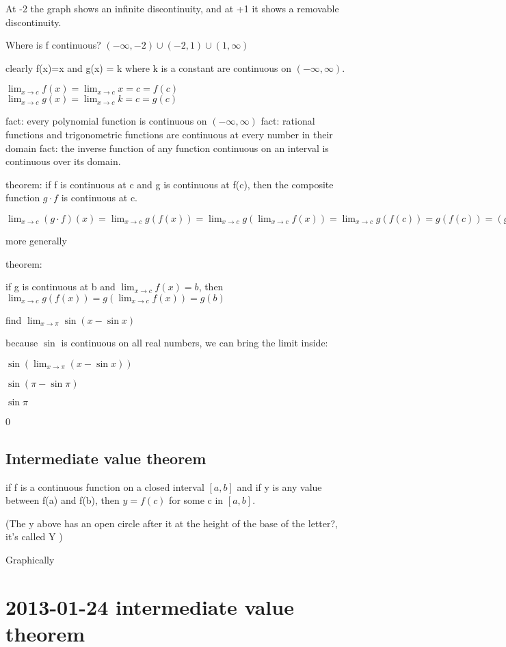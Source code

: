 \documentclass[12pt]{article}
\begin{document}
At -2 the graph shows an infinite discontinuity, and at +1 it shows a removable discontinuity.

Where is f continuous? $(-\infty,-2)\cup(-2,1)\cup(1,\infty)$

clearly f(x)=x and g(x) = k where k is a constant are continuous on $(-\infty,\infty)$.

$\lim_{x \to c}f(x) = \lim_{x \to c}x = c = f(c)$
$\lim_{x \to c}g(x) = \lim_{x \to c}k = c = g(c)$

fact: every polynomial function is continuous on $(-\infty,\infty)$
fact: rational functions and trigonometric functions are continuous at every number in their domain
fact: the inverse function of any function continuous on an interval is continuous over its domain.

theorem: if f is continuous at c and g is continuous at f(c), then the composite function $g \cdot f$ is
continuous at c.

$\lim_{x \to c}(g \cdot f)(x) = \lim_{x \to c}g(f(x)) = \lim_{x \to c}g(\lim_{x \to c}f(x)) = \lim_{x \to
  c}g(f(c)) = g(f(c)) = (g\cdot f)(c)$

more generally

theorem:

if g is continuous at b and $\lim_{x \to c}f(x) = b$, then $\lim_{x \to c}g(f(x)) = g(\lim_{x \to c}f(x)) =
g(b)$

find $\lim_{x \to \pi}\sin(x - \sin x)$

because $\sin$ is continuous on all real numbers, we can bring the limit inside:

$\sin(\lim_{x \to \pi}(x - \sin x))$

$\sin(\pi - \sin \pi)$

$\sin \pi$

0

\subsection{Intermediate value theorem}
if f is a continuous function on a closed interval $[a,b]$ and if y is any value between f(a) and f(b), then $y
= f(c)$ for some c in $[a,b]$.

(The y above has an open circle after it at the height of the base of the letter?, it's called Y )

Graphically

\section{2013-01-24 intermediate value theorem}
\end{document}
